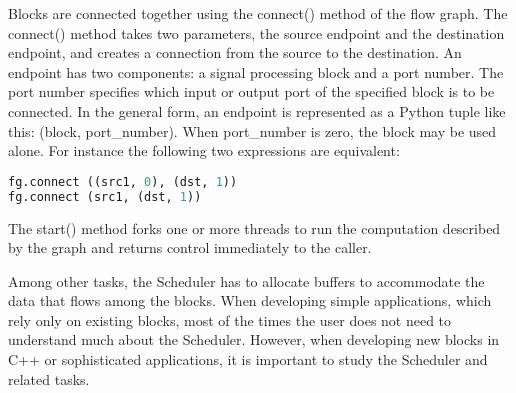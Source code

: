 Blocks are connected together using the connect()
method of the flow graph. The connect() method takes two parameters, the source
endpoint and the destination endpoint, and creates a connection from the source to the
destination. An endpoint has two components: a signal processing block and a port
number. The port number specifies which input or output port of the specified block is
to be connected. In the general form, an endpoint is represented as a Python tuple like
this: (block, port\_number). When port\_number is zero, the block may be used alone.
For instance the following two expressions are equivalent:
\begin{lstlisting}[language=Python]
fg.connect ((src1, 0), (dst, 1))
fg.connect (src1, (dst, 1))
\end{lstlisting}
The start() method forks one or more threads to run the computation
described by the graph and returns control immediately to the caller. 

Among other tasks, the Scheduler has to allocate buffers to accommodate the data that flows among the blocks.
When developing simple applications, which rely only on existing blocks, most of the times the user does not need to understand much about the Scheduler.
However, when developing new blocks in C++ or sophisticated applications, it is important to study the Scheduler and related tasks.




